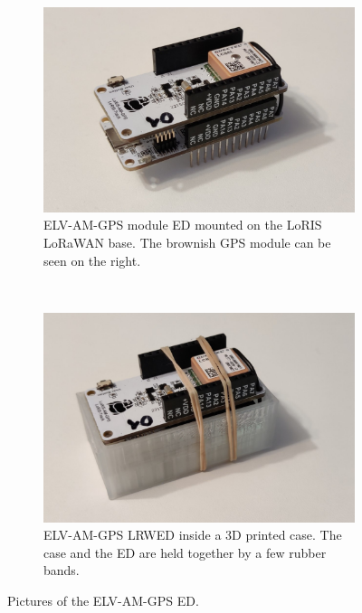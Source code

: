 \begin{figure}
    \centering

    \begin{subfigure}[t]{0.5\textwidth}
        \centering
        \includegraphics[width=1\textwidth]{pictures/hardware/gps-nodes/loris_bare.jpg}
        \caption[ELV-AM-GPS module \acl{ED} mounted on the LoRIS \ac{LoRaWAN} base]{
            ELV-AM-GPS module \acl{ED} mounted on the LoRIS \ac{LoRaWAN} base.
            The brownish \ac{GPS} module can be seen on the right.
        }\label{pic:loris-node-bare}
    \end{subfigure}%
    ~
    \begin{subfigure}[t]{0.5\textwidth}
        \centering
        \includegraphics[width=1\textwidth]{pictures/hardware/gps-nodes/loris_with_case.jpg}
        \caption[ELV-AM-GPS \acl{LRWED} inside a 3D printed case]{
            ELV-AM-GPS \acl{LRWED} inside a 3D printed case.
            The case and the \acl{ED} are held together by a few rubber bands.
        }\label{pic:loris-node-with-case}
    \end{subfigure}

    \caption{Pictures of the ELV-AM-GPS \acl{ED}.}
\end{figure}

